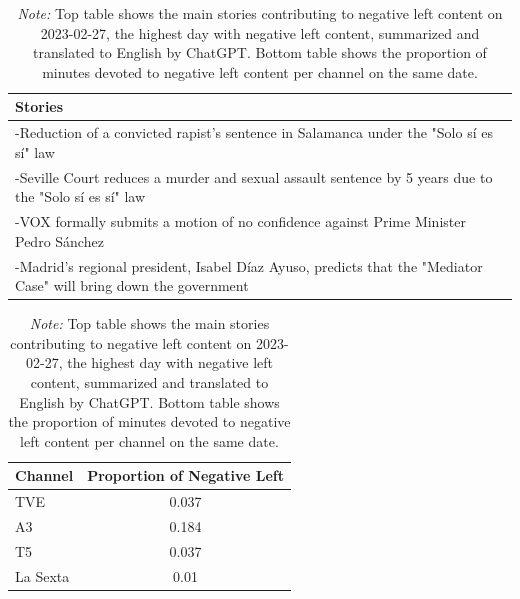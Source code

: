 \documentclass[12pt]{article}
\begin{document}
		\begin{table}[!htb]
								\caption{Top Stories for Negative Left and Outlet's Production}
		\centering
		\begin{tabular}{p{}}
			\toprule
			\textbf{Stories}  \\
			\midrule
			-Reduction of a convicted rapist’s sentence in Salamanca under the "Solo sí es sí" law  \\
			-Seville Court reduces a murder and sexual assault sentence by 5 years due to the "Solo sí es sí" law  \\
			-VOX formally submits a motion of no confidence against Prime Minister Pedro Sánchez  \\
			-Madrid’s regional president, Isabel Díaz Ayuso, predicts that the "Mediator Case" will bring down the government  \\
			\bottomrule
		\end{tabular}
		\begin{tabular}{l c}
			\toprule
			\textbf{Channel} & \textbf{Proportion of Negative Left} \\
			\midrule
			TVE & 0.037 \\
			A3  & 0.184 \\
			T5  & 0.037 \\
			La Sexta  & 0.01 \\
			\bottomrule
		\end{tabular}

		
					\caption*{\small  \textit{Note:} Top table shows the main stories contributing to negative left content on 2023-02-27, the highest day with negative left content,  summarized and translated to English by ChatGPT. Bottom table shows the proportion of minutes devoted to negative left content per channel on the same date.}
		
		\label{tab:neg_left_channels}
	\end{table}
	
\end{document}
